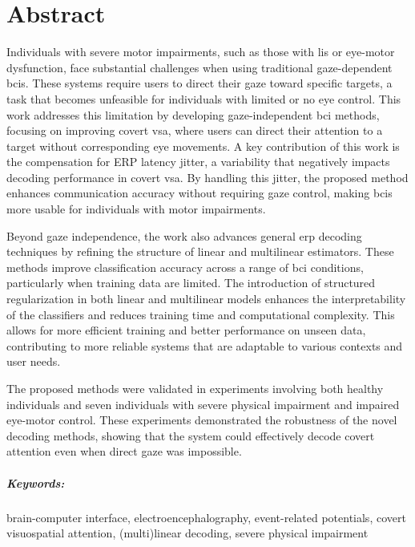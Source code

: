 \chapter*{Abstract}

Individuals with severe motor impairments, such as those with \ac{lis}
or eye-motor dysfunction, face substantial challenges when using traditional
gaze-dependent \acp{bci}.
These systems require users to direct their gaze toward specific targets, a
task that becomes unfeasible for individuals with limited or no eye control.
This work addresses this limitation by developing gaze-independent
\ac{bci} methods, focusing on improving covert \ac{vsa}, where users can direct
their attention to a target without corresponding eye movements.
A key contribution of this work is the compensation for ERP latency jitter, a
variability that negatively impacts decoding performance in covert \ac{vsa}.
By handling this jitter, the proposed method enhances communication accuracy
without requiring gaze control, making \acp{bci} more usable for individuals with
motor impairments.

Beyond gaze independence, the work also advances general \ac{erp} decoding
techniques by refining the structure of linear and multilinear estimators.
These methods improve classification accuracy across a range of \ac{bci}
conditions, particularly when training data are limited.
The introduction of structured regularization in both linear and multilinear
models enhances the interpretability of the classifiers and reduces training
time and computational complexity.
This allows for more efficient training and better performance on unseen data,
contributing to more reliable systems that are adaptable to various contexts and user needs.

The proposed methods were validated in experiments involving both healthy
individuals and seven individuals with severe physical impairment and impaired eye-motor control.
These experiments demonstrated the robustness of the novel decoding methods,
showing that the system could effectively decode covert attention even when
direct gaze was impossible.

\paragraph{Keywords:} brain-computer interface, electroencephalography,
event-related potentials, covert visuospatial attention, (multi)linear
decoding, severe physical impairment
